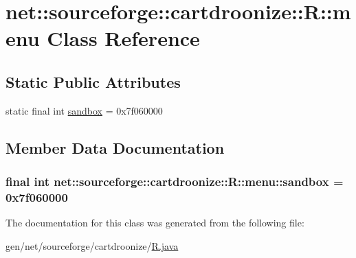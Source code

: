 \hypertarget{classnet_1_1sourceforge_1_1cartdroonize_1_1R_1_1menu}{
\section{net::sourceforge::cartdroonize::R::menu Class Reference}
\label{classnet_1_1sourceforge_1_1cartdroonize_1_1R_1_1menu}
}
\subsection*{Static Public Attributes}
\begin{DoxyCompactItemize}
\item 
static final int \hyperlink{classnet_1_1sourceforge_1_1cartdroonize_1_1R_1_1menu_a370b4baa5fd5418d034172348fffe5b4}{sandbox} = 0x7f060000
\end{DoxyCompactItemize}


\subsection{Member Data Documentation}
\hypertarget{classnet_1_1sourceforge_1_1cartdroonize_1_1R_1_1menu_a370b4baa5fd5418d034172348fffe5b4}{
\subsubsection[{sandbox}]{\setlength{\rightskip}{0pt plus 5cm}final int {\bf net::sourceforge::cartdroonize::R::menu::sandbox} = 0x7f060000}}
\label{classnet_1_1sourceforge_1_1cartdroonize_1_1R_1_1menu_a370b4baa5fd5418d034172348fffe5b4}


The documentation for this class was generated from the following file:\begin{DoxyCompactItemize}
\item 
gen/net/sourceforge/cartdroonize/\hyperlink{R_8java}{R.java}\end{DoxyCompactItemize}
